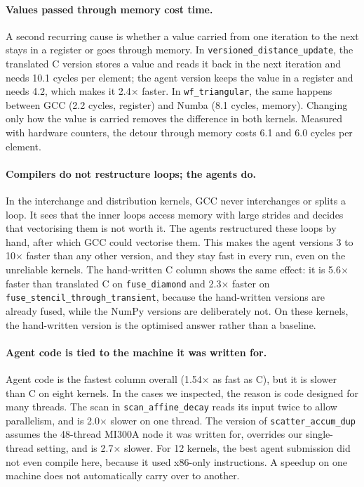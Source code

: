 \paragraph{Values passed through memory cost time.}
A second recurring cause is whether a value carried from one iteration to the next stays in a
register or goes through memory. In \texttt{versioned\_distance\_update}, the translated C version
stores a value and reads it back in the next iteration and needs 10.1 cycles per element; the
agent version keeps the value in a register and needs 4.2, which makes it 2.4$\times$ faster. In
\texttt{wf\_triangular}, the same happens between GCC (2.2 cycles, register) and Numba (8.1
cycles, memory). Changing only how the value is carried removes the difference in both kernels.
Measured with hardware counters, the detour through memory costs 6.1 and 6.0 cycles per element.

\paragraph{Compilers do not restructure loops; the agents do.}
In the interchange and distribution kernels, GCC never interchanges or splits a loop. It sees
that the inner loops access memory with large strides and decides that vectorising them is not
worth it. The agents restructured these loops by hand, after which GCC could vectorise them.
This makes the agent versions 3 to 10$\times$ faster than any other version, and they stay fast
in every run, even on the unreliable kernels. The hand-written C column shows the same effect:
it is 5.6$\times$ faster than translated C on \texttt{fuse\_diamond} and 2.3$\times$ faster on
\texttt{fuse\_stencil\_through\_transient}, because the hand-written versions are already fused,
while the NumPy versions are deliberately not. On these kernels, the hand-written version is the
optimised answer rather than a baseline.

\paragraph{Agent code is tied to the machine it was written for.}
Agent code is the fastest column overall (1.54$\times$ as fast as C), but it is slower than C on
eight kernels. In the cases we inspected, the reason is code designed for many threads. The scan
in \texttt{scan\_affine\_decay} reads its input twice to allow parallelism, and is 2.0$\times$
slower on one thread. The version of \texttt{scatter\_accum\_dup} assumes the 48-thread MI300A
node it was written for, overrides our single-thread setting, and is 2.7$\times$ slower. For 12
kernels, the best agent submission did not even compile here, because it used x86-only
instructions. A speedup on one machine does not automatically carry over to another.

